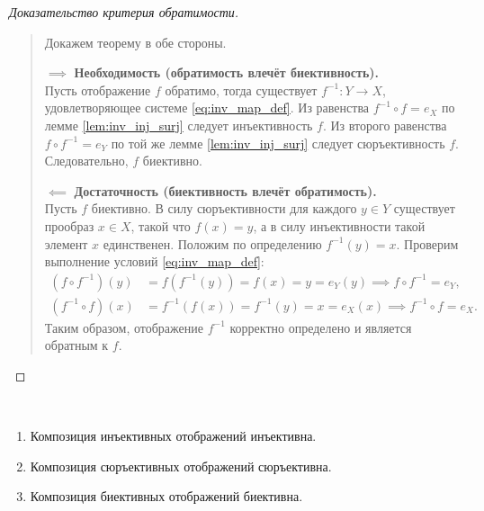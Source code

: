 \begin{proof}[Доказательство критерия обратимости]~\\
    \begin{quote}
        Докажем теорему в обе стороны.

        $\implies$ \textbf{Необходимость (обратимость влечёт биективность).}\\
        Пусть отображение $f$ обратимо, тогда существует $f^{-1}: Y \to X$, 
        удовлетворяющее системе \eqref{eq:inv_map_def}. Из равенства 
        $f^{-1} \circ f = e_X$ по лемме \ref{lem:inv_inj_surj} следует 
        инъективность $f$. Из второго равенства $f \circ f^{-1} = e_Y$ по 
        той же лемме \ref{lem:inv_inj_surj} следует сюръективность $f$. 
        Следовательно, $f$ биективно.

        $\impliedby$ \textbf{Достаточность (биективность влечёт обратимость).}\\
        Пусть $f$ биективно. В силу сюръективности для каждого $y \in Y$ 
        существует прообраз $x \in X$, такой что $f(x) = y$, а в силу 
        инъективности такой элемент $x$ единственен. Положим по определению 
        $f^{-1}(y) = x$. Проверим выполнение условий \eqref{eq:inv_map_def}:
        \begin{align*}
            (f \circ f^{-1})(y) &= f(f^{-1}(y)) = f(x) = y = e_Y(y) 
            \implies f \circ f^{-1} = e_Y, \\
            (f^{-1} \circ f)(x) &= f^{-1}(f(x)) = f^{-1}(y) = x = e_X(x) 
            \implies f^{-1} \circ f = e_X.
        \end{align*}
        Таким образом, отображение $f^{-1}$ корректно определено и является 
        обратным к $f$.
    \end{quote}
\end{proof}

\begin{theorem} ~
    \begin{enumerate}
        \item Композиция инъективных отображений инъективна.
        \item Композиция сюръективных отображений сюръективна.
        \item Композиция биективных отображений биективна.
    \end{enumerate}
\end{theorem}

